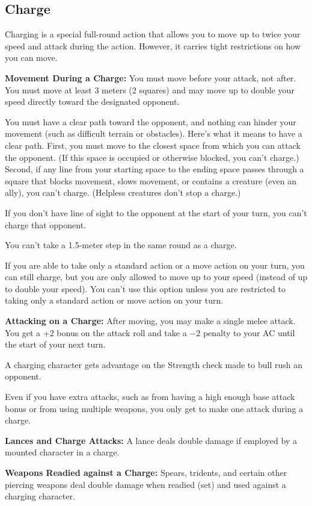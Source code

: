 \subsection{Charge}
Charging is a special full-round action that allows you to move up to twice your speed and attack during the action. However, it carries tight restrictions on how you can move.

\textbf{Movement During a Charge:} You must move before your attack, not after. You must move at least 3 meters (2 squares) and may move up to double your speed directly toward the designated opponent.

You must have a clear path toward the opponent, and nothing can hinder your movement (such as difficult terrain or obstacles). Here's what it means to have a clear path. First, you must move to the closest space from which you can attack the opponent. (If this space is occupied or otherwise blocked, you can't charge.) Second, if any line from your starting space to the ending space passes through a square that blocks movement, slows movement, or contains a creature (even an ally), you can't charge. (Helpless creatures don't stop a charge.)

If you don't have line of sight to the opponent at the start of your turn, you can't charge that opponent.

You can't take a 1.5-meter step in the same round as a charge.

If you are able to take only a standard action or a move action on your turn, you can still charge, but you are only allowed to move up to your speed (instead of up to double your speed). You can't use this option unless you are restricted to taking only a standard action or move action on your turn.

\textbf{Attacking on a Charge:} After moving, you may make a single melee attack. You get a +2 bonus on the attack roll and take a $-2$ penalty to your AC until the start of your next turn.

A charging character gets advantage on the Strength check made to bull rush an opponent.

Even if you have extra attacks, such as from having a high enough base attack bonus or from using multiple weapons, you only get to make one attack during a charge.

\textbf{Lances and Charge Attacks:} A lance deals double damage if employed by a mounted character in a charge.

\textbf{Weapons Readied against a Charge:} Spears, tridents, and certain other piercing weapons deal double damage when readied (set) and used against a charging character.